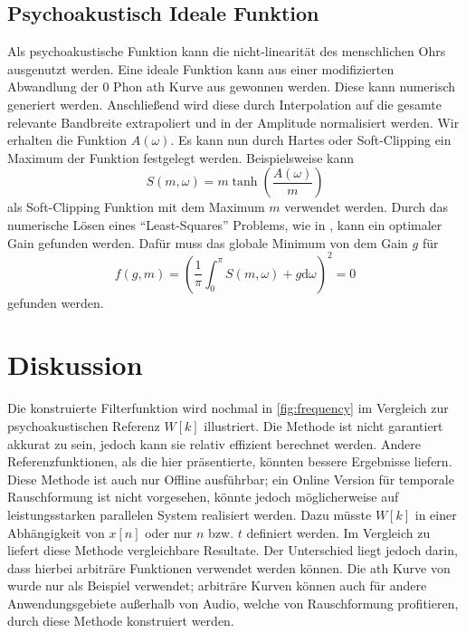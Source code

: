 \subsection{Psychoakustisch Ideale Funktion}

Als psychoakustische Funktion kann die nicht-linearität des menschlichen Ohrs ausgenutzt werden.
Eine ideale Funktion kann aus einer modifizierten Abwandlung der $0$ Phon \gls{ath} Kurve aus \autocite{iso226} gewonnen werden.
Diese kann numerisch generiert werden.
Anschließend wird diese durch Interpolation auf die gesamte relevante Bandbreite extrapoliert und in der Amplitude normalisiert werden.
Wir erhalten die Funktion $A(\omega)$.
Es kann nun durch Hartes oder Soft-Clipping ein Maximum der Funktion festgelegt werden.
Beispielsweise kann
\begin{equation}
S(m, \omega) = m \tanh \left( \frac{A(\omega)}{m} \right)
\end{equation}
als Soft-Clipping Funktion mit dem Maximum $m$ verwendet werden.
Durch das numerische Lösen eines \foreignquote{english}{Least-Squares} Problems, wie in \autocite{noise-shaping}, kann ein optimaler Gain gefunden werden.
Dafür muss das globale Minimum von dem Gain $g$ für
\begin{equation}
f(g, m) = \left( \frac{1}{\pi} \int_{0}^{\pi} S(m, \omega) + g \text{d}\omega \right)^2 = 0
\end{equation}
gefunden werden.

\section{Diskussion}

Die konstruierte Filterfunktion wird nochmal in \autoref{fig:frequency} im Vergleich zur psychoakustischen Referenz $W[k]$ illustriert.
Die Methode ist nicht garantiert akkurat zu sein, jedoch kann sie relativ effizient berechnet werden.
Andere Referenzfunktionen, als die hier präsentierte, könnten bessere Ergebnisse liefern.
Diese Methode ist auch nur Offline ausführbar; ein Online Version für temporale Rauschformung ist nicht vorgesehen, könnte jedoch möglicherweise auf leistungsstarken parallelen System realisiert werden.
Dazu müsste $W[k]$ in einer Abhängigkeit von $x[n]$ oder nur $n$ bzw. $t$ definiert werden.
Im Vergleich zu \autocite{noise-shaping} liefert diese Methode vergleichbare Resultate.
Der Unterschied liegt jedoch darin, dass hierbei arbiträre Funktionen verwendet werden können.
Die \gls{ath} Kurve von \autocite{iso226} wurde nur als Beispiel verwendet;
arbiträre Kurven können auch für andere Anwendungsgebiete außerhalb von Audio, welche von Rauschformung profitieren, durch diese Methode konstruiert werden.

